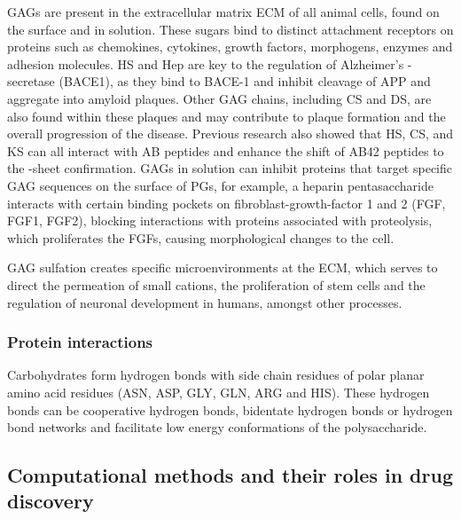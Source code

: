 \documentclass[journal=jctcce,manuscript=article]{achemso}
\begin{document}
{\Acp{GAG} are present in the extracellular matrix \ac{ECM} of all animal cells, found on the surface and in solution. These sugars bind to distinct attachment receptors on proteins such as chemokines, cytokines, growth factors, morphogens, enzymes and adhesion molecules\cite{Murphy2007StructuralHeparin, Iozzo2001HeparanArena, Kreuger2006InteractionsSpecificity, Kowitsch2018MedicalReview}. \ac{HS} and \ac{Hep} are key to the regulation of Alzheimer's  \textbeta-secretase (BACE1), as they bind to BACE-1 and inhibit cleavage of \ac{APP} and aggregate into amyloid plaques.\cite{Swarup2013SugarNeurons,Scholefield2003HeparanBeta-secretase.} Other GAG chains, including CS and DS, are also found within these plaques and may contribute to plaque formation and the overall progression of the disease. Previous research also showed that HS, CS, and KS can all interact with AB peptides and enhance the shift of AB42 peptides to the \textbeta-sheet confirmation. GAGs in solution can inhibit proteins that target specific GAG sequences on the surface of PGs, for example, a heparin pentasaccharide interacts with certain binding pockets on fibroblast-growth-factor 1 and 2 (FGF, FGF1, FGF2), blocking interactions with proteins associated with proteolysis, which proliferates the FGFs, causing morphological changes to the cell\cite{SoaresdaCosta2017SulfationDisorders}. 

GAG sulfation creates specific microenvironments at the ECM, which serves to direct the permeation of small cations, the proliferation of stem cells and the regulation of neuronal development in humans, amongst other processes. 

\subsubsection{Protein interactions}
Carbohydrates form hydrogen bonds with side chain residues of polar planar amino acid residues (ASN, ASP, GLY, GLN, ARG and HIS)\cite{Malik2007SequenceNetwork}.
These hydrogen bonds can be cooperative hydrogen bonds, bidentate hydrogen bonds or hydrogen bond networks and facilitate low energy conformations of the polysaccharide.\cite{Quiocho1989Protein-carbohydrateFeatures} 



\subsection{Computational methods and their roles in drug discovery}

}
\end{document}
